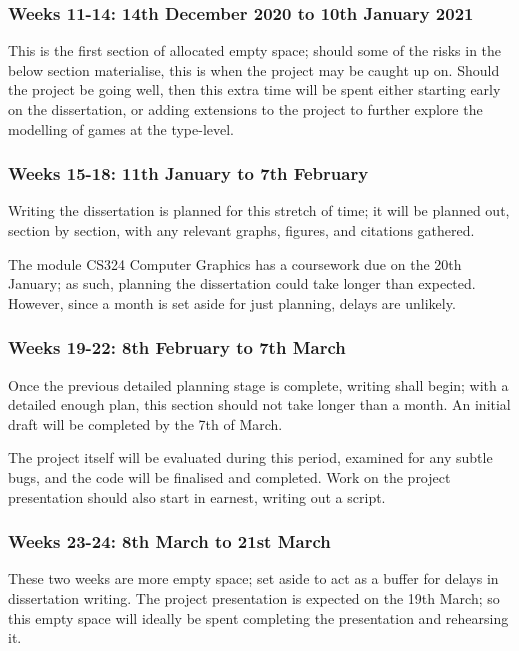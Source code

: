 \documentclass[12pt, a4paper]{scrartcl}
\begin{document}
\subsubsection{Weeks 11-14: 14th December 2020 to 10th January 2021}

This is the first section of allocated empty space; should some of the risks in the below section materialise, this is when the project may be caught up on. Should the project be going well, then this extra time will be spent either starting early on the dissertation, or adding extensions to the project to further explore the modelling of games at the type-level.

\subsubsection{Weeks 15-18: 11th January to 7th February}

Writing the dissertation is planned for this stretch of time; it will be planned out, section by section, with any relevant graphs, figures, and citations gathered.

The module CS324 Computer Graphics has a coursework due on the 20th January; as such, planning the dissertation could take longer than expected. However, since a month is set aside for just planning, delays are unlikely.

\subsubsection{Weeks 19-22: 8th February to 7th March}

Once the previous detailed planning stage is complete, writing shall begin; with a detailed enough plan, this section should not take longer than a month. An initial draft will be completed by the 7th of March.

The project itself will be evaluated during this period, examined for any subtle bugs, and the code will be finalised and completed. Work on the project presentation should also start in earnest, writing out a script.

\subsubsection{Weeks 23-24: 8th March to 21st March}

These two weeks are more empty space; set aside to act as a buffer for delays in dissertation writing. The project presentation is expected on the 19th March; so this empty space will ideally be spent completing the presentation and rehearsing it.
\end{document}
